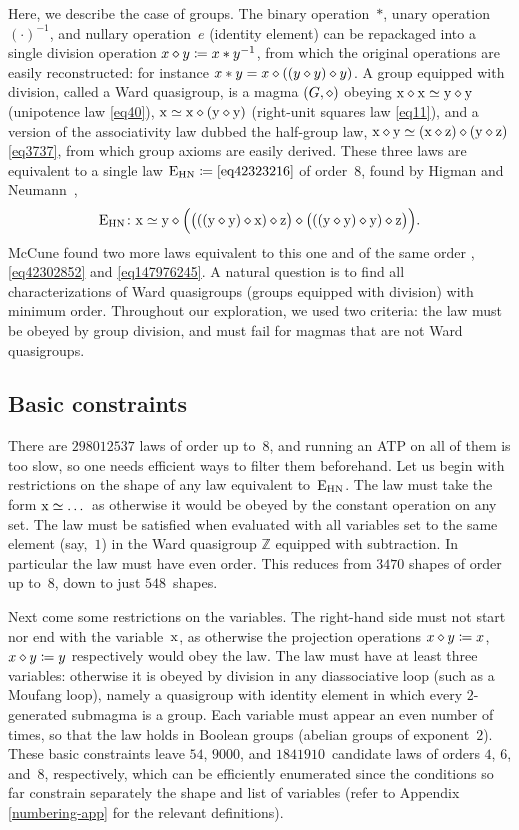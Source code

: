 Here, we describe the case of groups.  The binary operation~$*$, unary operation~$(\cdot )^{-1}$, and nullary operation~$e$ (identity element) can be repackaged into a single division operation $x \diamond y \coloneqq x*y^{-1}$, from which the original operations are easily reconstructed: for instance $x*y=x\diamond((y\diamond y)\diamond y)$.  A group equipped with division, called a Ward quasigroup, is a magma $(G, \diamond)$ obeying $\mathrm{x} \diamond \mathrm{x} \simeq \mathrm{y} \diamond \mathrm{y}$ (unipotence law \eqref{eq40}), $\mathrm{x} \simeq \mathrm{x} \diamond (\mathrm{y} \diamond \mathrm{y})$ (right-unit squares law \eqref{eq11}), and a version of the associativity law dubbed the half-group law, $\mathrm{x} \diamond \mathrm{y} \simeq (\mathrm{x} \diamond \mathrm{z}) \diamond (\mathrm{y} \diamond \mathrm{z})$ \eqref{eq3737}, from which group axioms are easily derived.
These three laws are equivalent to a single law $\mathrm{E}_{\mathrm{HN}}\coloneqq\eqref{eq42323216}$ of order~$8$, found by Higman and Neumann~\cite{higman-neumann},
\[
\mathrm{E}_{\mathrm{HN}} \colon \mathrm{x} \simeq \mathrm{y} \diamond \Bigl(\bigl(((\mathrm{y} \diamond \mathrm{y}) \diamond \mathrm{x}) \diamond \mathrm{z}\bigr) \diamond \bigl(((\mathrm{y} \diamond \mathrm{y}) \diamond \mathrm{y}) \diamond \mathrm{z}\bigr)\Bigr) .
\]
McCune found two more laws equivalent to this one and of the same order \cite{mccune1993single}, \eqref{eq42302852} and \eqref{eq147976245}.  A natural question is to find all characterizations of Ward quasigroups (groups equipped with division) with minimum order.
Throughout our exploration, we used two criteria: the law must be obeyed by group division, and must fail for magmas that are not Ward quasigroups.

\subsection{Basic constraints}

There are $\num{298012537}$ laws of order up to~$8$, and running an ATP on all of them is too slow, so one needs efficient ways to filter them beforehand.  Let us begin with restrictions on the shape of any law equivalent to~$\mathrm{E}_{\mathrm{HN}}$.
The law must take the form $\mathrm{x}\simeq\dots$ as otherwise it would be obeyed by the constant operation on any set.
The law must be satisfied when evaluated with all variables set to the same element (say,~$1$) in the Ward quasigroup $\mathbb{Z}$ equipped with subtraction.  In particular the law must have even order.
This reduces from $\num{3470}$ shapes of order up to~$8$, down to just $548$~shapes.

Next come some restrictions on the variables.
The right-hand side must not start nor end with the variable~$\mathrm{x}$, as otherwise the projection operations $x\diamond y \coloneqq x$, $x\diamond y\coloneqq y$ respectively would obey the law.
The law must have at least three variables: otherwise it is obeyed by division in any diassociative loop (such as a Moufang loop), namely a quasigroup with identity element in which every $2$-generated submagma is a group.
Each variable must appear an even number of times, so that the law holds in Boolean groups (abelian groups of exponent~$2$).
These basic constraints leave $54$, $\num{9000}$, and $\num{1841910}$~candidate laws of orders $4$, $6$, and~$8$, respectively, which can be efficiently enumerated since the conditions so far constrain separately the shape and list of variables (refer to Appendix \ref{numbering-app} for the relevant definitions).

